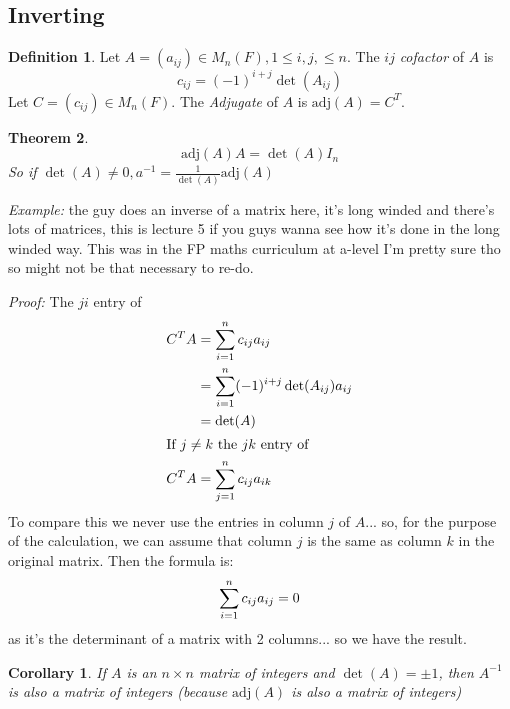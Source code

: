 \documentclass{report}
\newtheorem{theorem}{Theorem}[subsection]
\newtheorem*{corollary}{Corollary}
\theoremstyle{remark}
\theoremstyle{definition}
\newtheorem{definition}[theorem]{Definition}
\theoremstyle{definition}
\theoremstyle{theorem}
\begin{document}
\subsection{Inverting}
\begin{definition}
Let $A = (a_{ij}) \in M_n(F), 1 \leq i,j, \leq n$. The $ij$ \emph{cofactor} of $A$ is
\[c_{ij}=(-1)^{i+j}\det(A_{ij})\]
Let $C = (c_{ij}) \in M_n(F)$. The \emph{Adjugate} of $A$ is $\mathrm{adj}(A)=C^T$.
\end{definition}
\begin{theorem}
\[\mathrm{adj}(A)A=\det(A)I_n\]
So if $\det(A) \neq 0, a^{-1}= \frac{1}{\det(A)}\mathrm{adj}(A)$
\end{theorem}
\emph{Example:} the guy does an inverse of a matrix here, it's long winded and there's lots of matrices, this is lecture 5 if you guys wanna see how it's done in the long winded way. This was in the FP maths curriculum at a-level I'm pretty sure tho so might not be that necessary to re-do.\par
\emph{Proof:} The $ji$ entry of 
\begin{align*}
    C^TA&=\sum_{i=1}^nc_{ij}a_{ij}\\
    &= \sum_{i=1}^n(-1)^{i+j}\det(A_{ij})a_{ij}\\
    &=\det(A)\\
    \intertext{If $j \neq k$ the $jk$ entry of}
    C^TA &= \sum_{j=1}^nc_{ij}a_{ik}
\end{align*}
To compare this we never use the entries in column $j$ of $A$... so, for the purpose of the calculation, we can assume that column $j$ is the same as column $k$ in the original matrix. Then the formula is:
\begin{equation*}
    \sum_{i=1}^nc_{ij}a_{ij}=0\\
\end{equation*}
as it's the determinant of a matrix with 2 columns... so we have the result.
\begin{corollary}
If $A$ is an $n \times n$ matrix of integers and $\det(A)=\pm1$, then $A^{-1}$ is also a matrix of integers (because $\mathrm{adj}(A)$ is also a matrix of integers)
\end{corollary}
\end{document}
